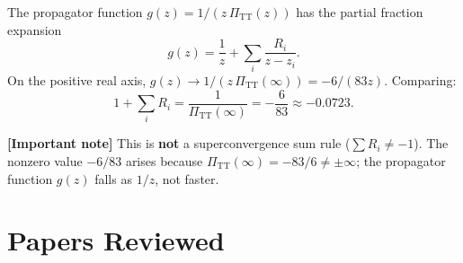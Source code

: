 \documentclass[11pt,a4paper]{article}
\theoremstyle{plain}
\theoremstyle{definition}
\theoremstyle{remark}
\newcommand{\PiTT}{\Pi_{\mathrm{TT}}}
\newcommand{\signcorrection}[1]{%
  \par\smallskip\noindent
  \colorbox{red!10}{\parbox{\dimexpr\linewidth-2\fboxsep}{%
    \textcolor{red!60!black}{\textbf{[Important note]}} #1}}%
  \par\smallskip}
\begin{document}
The propagator function $g(z) = 1/(z\,\PiTT(z))$ has the partial
fraction expansion
\begin{equation}
  g(z) = \frac{1}{z} + \sum_i \frac{R_i}{z - z_i}.
\end{equation}
On the positive real axis, $g(z) \to 1/(z\,\PiTT(\infty))
= -6/(83z)$.  Comparing:
\begin{equation}\label{eq:sum-rule}
  \boxed{1 + \sum_i R_i = \frac{1}{\PiTT(\infty)} = -\frac{6}{83}
  \approx -0.0723.}
\end{equation}

\signcorrection{This is \textbf{not} a superconvergence sum rule
($\sum R_i \neq -1$).  The nonzero value $-6/83$ arises because
$\PiTT(\infty) = -83/6 \neq \pm\infty$; the propagator function $g(z)$
falls as $1/z$, not faster.}


\section{Papers Reviewed}
\label{sec:papers}
\end{document}
